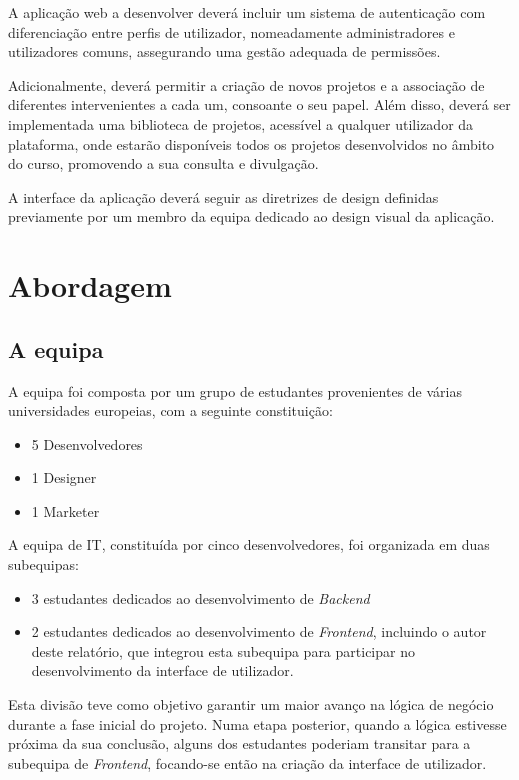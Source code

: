 A aplicação web a desenvolver deverá incluir um sistema de autenticação com diferenciação entre perfis de utilizador, nomeadamente administradores e utilizadores comuns, assegurando uma gestão adequada de permissões. 

Adicionalmente, deverá permitir a criação de novos projetos e a associação de diferentes intervenientes a cada um, consoante o seu papel. Além disso, deverá ser implementada uma biblioteca de projetos, acessível a qualquer utilizador da plataforma, onde estarão disponíveis todos os projetos desenvolvidos no âmbito do curso, promovendo a sua consulta e divulgação.

A interface da aplicação deverá seguir as diretrizes de design definidas previamente por um membro da equipa dedicado ao design visual da aplicação.


\section{Abordagem}

\subsection{A equipa}

A equipa foi composta por um grupo de estudantes provenientes de várias universidades europeias, com a seguinte constituição:

\begin{itemize}
    \item 5 Desenvolvedores
    \item 1 Designer
    \item 1 Marketer
\end{itemize}

A equipa de IT, constituída por cinco desenvolvedores, foi organizada em duas subequipas: 
\begin{itemize}
    \item 3 estudantes dedicados ao desenvolvimento de \textit{Backend}
    \item 2 estudantes dedicados ao desenvolvimento de \textit{Frontend}, incluindo o autor deste relatório, que integrou esta subequipa para participar no desenvolvimento da interface de utilizador.
\end{itemize}

Esta divisão teve como objetivo garantir um maior avanço na lógica de negócio durante a fase inicial do projeto. 
Numa etapa posterior, quando a lógica estivesse próxima da sua conclusão, alguns dos estudantes poderiam transitar para a subequipa de \textit{Frontend}, focando-se então na criação da interface de utilizador.

